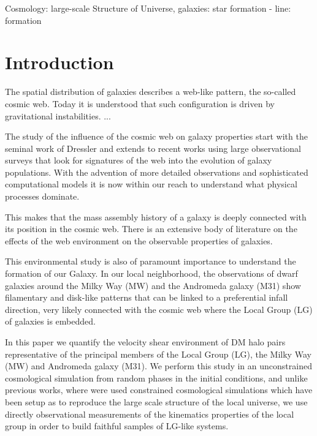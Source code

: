 \documentclass[usenatbib]{latex/mn2e}
\begin{document}
\begin{keywords}
Cosmology: large-scale Structure of Universe, 
galaxies: star formation - line: formation
\end{keywords}



\section{Introduction}
\label{sec:introduction}


The spatial distribution of galaxies describes a web-like pattern, the 
so-called cosmic web. Today it is understood that such configuration is 
driven by gravitational instabilities. ...



The study of the influence of the cosmic web on galaxy properties start 
with the seminal work of Dressler  and extends to 
recent works using large observational surveys that look for signatures of 
the web into the evolution of galaxy populations. With the advention of 
more detailed observations and sophisticated computational models it is 
now within our reach to understand what physical processes dominate.



This makes  that the mass assembly history of a galaxy is deeply connected 
with its  position in the cosmic web. There is an extensive body of 
literature on the effects of the web environment on the observable 
properties of galaxies. 



This environmental study is also of paramount importance to understand the 
formation of our Galaxy. In our local neighborhood, the observations of 
dwarf galaxies around the Milky Way (MW) and the Andromeda galaxy (M31) 
show filamentary and disk-like patterns that can be linked to a 
preferential infall direction, very likely connected with the cosmic web 
where the Local Group (LG) of galaxies is embedded. 



In this paper we quantify the velocity shear environment of DM halo pairs
representative of the principal members of the Local Group (LG), the Milky
Way (MW) and Andromeda galaxy (M31). We perform this study in an 
unconstrained cosmological simulation from random phases in the initial 
conditions, and unlike previous works, where were used constrained 
cosmological simulations which have been setup as to reproduce the large 
scale structure of the local universe, we use directly observational 
measurements of the kinematics properties of the local group  in order to build faithful samples of LG-like systems.
\end{document}
